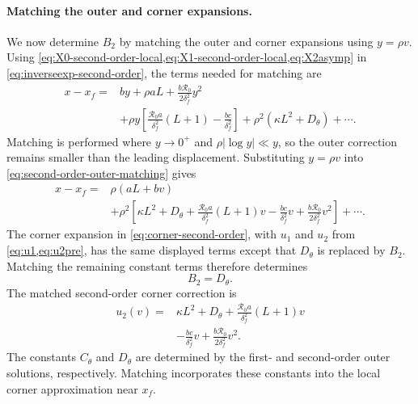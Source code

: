 \documentclass[11pt]{article}
\newcommand{\Rzero}{\mathcal R_0}
\newcommand{\rhoeps}{\rho}
\newcommand{\xf}{x_f}
\newcommand{\Cth}{C_\theta}
\newcommand{\Dth}{D_\theta}
\begin{document}
\paragraph{Matching the outer and corner expansions.}
We now determine \(B_2\) by matching the outer and corner expansions using \(y=\rhoeps v\). Using \cref{eq:X0-second-order-local,eq:X1-second-order-local,eq:X2asymp} in \cref{eq:inverseexp-second-order}, the terms needed for matching are
\begin{equation}
\begin{aligned}
x-\xf={}&by+\rhoeps aL+\frac{b\Rzero}{2\delta_f^2}y^2\\
&+\rhoeps y\left[\frac{\Rzero a}{\delta_f^2}(L+1)-\frac{bc}{\delta_f^2}\right]
+\rhoeps^2(\kappa L^2+\Dth)+\cdots.
\end{aligned}
\label{eq:second-order-outer-matching}
\end{equation}
Matching is performed where \(y\to0^+\) and \(\rhoeps|\log y|\ll y\), so the outer correction remains smaller than the leading displacement. Substituting \(y=\rhoeps v\) into \cref{eq:second-order-outer-matching} gives
\begin{equation}
\begin{aligned}
x-\xf={}&\rhoeps(aL+bv)\\
&+\rhoeps^2\left[\kappa L^2+\Dth
+\frac{\Rzero a}{\delta_f^2}(L+1)v
-\frac{bc}{\delta_f^2}v
+\frac{b\Rzero}{2\delta_f^2}v^2\right]+\cdots.
\end{aligned}
\label{eq:second-order-outer-local}
\end{equation}
The corner expansion in \cref{eq:corner-second-order}, with \(u_1\) and \(u_2\) from \cref{eq:u1,eq:u2pre}, has the same displayed terms except that \(\Dth\) is replaced by \(B_2\). Matching the remaining constant terms therefore determines
\begin{equation}
B_2=\Dth.
\label{eq:B2-matched}
\end{equation}
The matched second-order corner correction is
\begin{equation}
\begin{split}
u_2(v)={}&\kappa L^2+\Dth
+\frac{\Rzero a}{\delta_f^2}(L+1)v\\
&-\frac{bc}{\delta_f^2}v
+\frac{b\Rzero}{2\delta_f^2}v^2.
\end{split}
\label{eq:u2final}
\end{equation}
The constants \(\Cth\) and \(\Dth\) are determined by the first- and second-order outer solutions, respectively. Matching incorporates these constants into the local corner approximation near \(\xf\).
\end{document}
